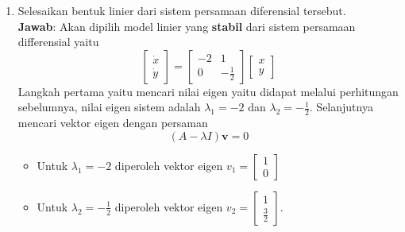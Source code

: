 \documentclass{article}
\begin{document}
\begin{enumerate}[label=\alph*.]
    \item Selesaikan bentuk linier dari sistem persamaan diferensial tersebut. \\
    \textbf{Jawab}: Akan dipilih model linier yang \textbf{stabil} dari sistem persamaan differensial yaitu 
    \[
    \begin{bmatrix}
        \dot{x} \\ \dot{y}
    \end{bmatrix} =
    \begin{bmatrix}
    -2 & 1 \\ 0 & -\frac{1}{2}
    \end{bmatrix} 
    \begin{bmatrix}
        x \\ y
    \end{bmatrix}
    \]
    Langkah pertama yaitu mencari nilai eigen yaitu didapat melalui perhitungan sebelumnya, nilai eigen sistem adalah $\lambda_1=-2$ dan $\lambda_2=-\frac{1}{2}$. 
    Selanjutnya mencari vektor eigen dengan persaman 
    \[ (A - \lambda I) \mathbf{v} = 0 \]
    \begin{itemize}
        \item Untuk $\lambda_1=-2$ diperoleh vektor eigen $v_1 = \begin{bmatrix}1 \\ 0\end{bmatrix}$
        \item Untuk $\lambda_2=-\frac{1}{2}$ diperoleh vektor eigen $v_2 = \begin{bmatrix}1 \\ \frac{3}{2}\end{bmatrix}$.
    \end{itemize}
    

\end{enumerate}
\end{document}
